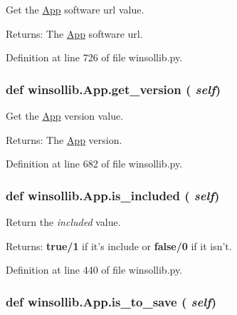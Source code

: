 Get the \hyperlink{classwinsollib_1_1App}{App} software url value. 

\begin{Desc}
\item[Returns:]The \hyperlink{classwinsollib_1_1App}{App} software url. \end{Desc}


Definition at line 726 of file winsollib.py.\hypertarget{classwinsollib_1_1App_822a56876d4b800de1139cc556b33b9d}{
\subsubsection[get\_\-version]{\setlength{\rightskip}{0pt plus 5cm}def winsollib.App.get\_\-version ( {\em self})}}
\label{classwinsollib_1_1App_822a56876d4b800de1139cc556b33b9d}


Get the \hyperlink{classwinsollib_1_1App}{App} version value. 

\begin{Desc}
\item[Returns:]The \hyperlink{classwinsollib_1_1App}{App} version. \end{Desc}


Definition at line 682 of file winsollib.py.\hypertarget{classwinsollib_1_1App_48008715376100efdc0bc3305f266ee3}{
\subsubsection[is\_\-included]{\setlength{\rightskip}{0pt plus 5cm}def winsollib.App.is\_\-included ( {\em self})}}
\label{classwinsollib_1_1App_48008715376100efdc0bc3305f266ee3}


Return the {\em included\/} value. 

\begin{Desc}
\item[Returns:]{\bf true/1} if it's include or {\bf false/0} if it isn't. \end{Desc}


Definition at line 440 of file winsollib.py.\hypertarget{classwinsollib_1_1App_2ad23a009d1ec4b059efd94aa3266011}{
\subsubsection[is\_\-to\_\-save]{\setlength{\rightskip}{0pt plus 5cm}def winsollib.App.is\_\-to\_\-save ( {\em self})}}
\label{classwinsollib_1_1App_2ad23a009d1ec4b059efd94aa3266011}


